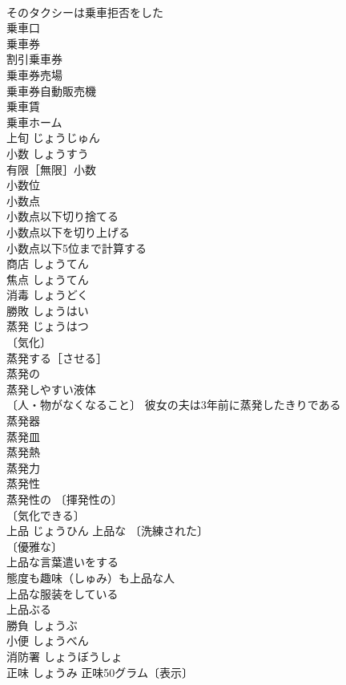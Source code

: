 \documentclass[8pt]{extreport}
\begin{document}
\begin{CJK}{UTF8}{min}
\\	そのタクシーは乗車拒否をした 
\\	乗車口 
\\	乗車券 
\\	割引乗車券 
\\	乗車券売場 
\\	乗車券自動販売機 
\\	乗車賃 
\\	乗車ホーム 
\\	上旬	じょうじゅん	
\\	小数	しょうすう	
\\	有限［無限］小数 
\\	小数位 
\\	小数点 
\\	小数点以下切り捨てる 
\\	小数点以下を切り上げる 
\\	小数点以下5位まで計算する 
\\	商店	しょうてん	
\\	焦点	しょうてん	
\\	消毒	しょうどく	
\\	勝敗	しょうはい	
\\	蒸発	じょうはつ	
\\	〔気化〕
\\	蒸発する［させる］ 
\\	蒸発の 
\\	蒸発しやすい液体 
\\	〔人・物がなくなること〕 彼女の夫は3年前に蒸発したきりである 
\\	蒸発器 
\\	蒸発皿 
\\	蒸発熱 
\\	蒸発力 
\\	蒸発性 
\\	蒸発性の 〔揮発性の〕
\\	〔気化できる〕
\\	上品	じょうひん	上品な 〔洗練された〕
\\	〔優雅な〕
\\	上品な言葉遣いをする 
\\	態度も趣味（しゅみ）も上品な人 
\\	上品な服装をしている 
\\	上品ぶる 
\\	勝負	しょうぶ	
\\	小便	しょうべん	
\\	消防署	しょうぼうしょ	
\\	正味	しょうみ	正味50グラム〔表示〕 

\end{CJK}
\end{document}
